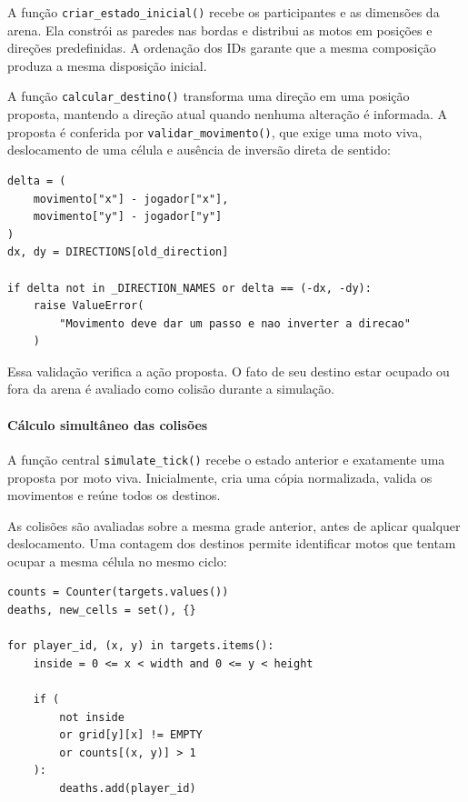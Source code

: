 \documentclass[11pt,a4paper]{article}
\begin{document}
A função \texttt{criar\_estado\_inicial()} recebe os participantes e as dimensões da arena. Ela constrói as paredes nas bordas e distribui as motos em posições e direções predefinidas. A ordenação dos IDs garante que a mesma composição produza a mesma disposição inicial.

A função \texttt{calcular\_destino()} transforma uma direção em uma posição proposta, mantendo a direção atual quando nenhuma alteração é informada. A proposta é conferida por \texttt{validar\_movimento()}, que exige uma moto viva, deslocamento de uma célula e ausência de inversão direta de sentido:

\par\smallskip
\noindent
\begin{minipage}{\linewidth}
\begin{verbatim}
delta = (
    movimento["x"] - jogador["x"],
    movimento["y"] - jogador["y"]
)
dx, dy = DIRECTIONS[old_direction]

if delta not in _DIRECTION_NAMES or delta == (-dx, -dy):
    raise ValueError(
        "Movimento deve dar um passo e nao inverter a direcao"
    )
\end{verbatim}
\end{minipage}
\par\smallskip

Essa validação verifica a ação proposta. O fato de seu destino estar ocupado ou fora da arena é avaliado como colisão durante a simulação.

\paragraph{Cálculo simultâneo das colisões}

A função central \texttt{simulate\_tick()} recebe o estado anterior e exatamente uma proposta por moto viva. Inicialmente, cria uma cópia normalizada, valida os movimentos e reúne todos os destinos.

As colisões são avaliadas sobre a mesma grade anterior, antes de aplicar qualquer deslocamento. Uma contagem dos destinos permite identificar motos que tentam ocupar a mesma célula no mesmo ciclo:

\par\smallskip
\noindent
\begin{minipage}{\linewidth}
\begin{verbatim}
counts = Counter(targets.values())
deaths, new_cells = set(), {}

for player_id, (x, y) in targets.items():
    inside = 0 <= x < width and 0 <= y < height

    if (
        not inside
        or grid[y][x] != EMPTY
        or counts[(x, y)] > 1
    ):
        deaths.add(player_id)
\end{verbatim}
\end{minipage}
\par\smallskip
\end{document}
